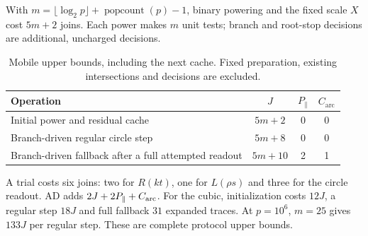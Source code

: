 \documentclass[11pt,a4paper]{article}
\begin{document}
With $m=\lfloor\log_2p\rfloor+\operatorname{popcount}(p)-1$, binary powering and the fixed scale $X$ cost $5m+2$ joins. Each power makes $m$ unit tests; branch and root-stop decisions are additional, uncharged decisions.

\begin{table}[H]\centering\small
\caption{Mobile upper bounds, including the next cache. Fixed preparation, existing intersections and decisions are excluded.}
\begin{tabularx}{\linewidth}{@{}Xccc@{}}\toprule
Operation & $J$ & $P_{\parallel}$ & $C_{\mathrm{arc}}$\\\midrule
Initial power and residual cache & $5m+2$ & 0 & 0\\
Branch-driven regular circle step & $5m+8$ & 0 & 0\\
Branch-driven fallback after a full attempted readout & $5m+10$ & 2 & 1\\
\bottomrule
\end{tabularx}
\end{table}
A trial costs six joins: two for $R(kt)$, one for $L(\rho s)$ and three for the circle readout. AD adds $2J+2P_{\parallel}+C_{\rm arc}$. For the cubic, initialization costs $12J$, a regular step $18J$ and full fallback $31$ expanded traces. At $p=10^6$, $m=25$ gives $133J$ per regular step. These are complete protocol upper bounds.

\clearpage
\end{document}
